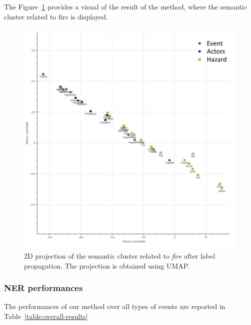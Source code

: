 The Figure~\ref{processing:fire-example} provides a visual of the result of the method, where the semantic cluster related to fire is displayed.

\begin{figure}[hp]
    \centering
    \includegraphics[width=\textwidth]{figures/chap-4/fire-example.pdf}
    \caption{2D projection of the semantic cluster related to \textit{fire} after label propagation. The projection is obtained using UMAP.}
    \label{processing:fire-example}
\end{figure}


\subsubsection{NER performances}
The performances of our method over all types of events are reported in Table~\ref{table:overall-results}


